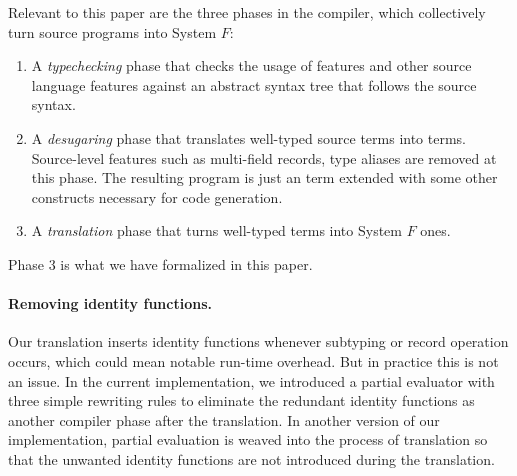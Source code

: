 Relevant to this paper are the three phases in the compiler, which
collectively turn source programs into System $F$:

\begin{enumerate}
\item A \emph{typechecking} phase that checks the usage of \name features and
  other source language features against an abstract syntax tree that follows
  the source syntax.

\item A \emph{desugaring} phase that translates well-typed source terms into
  \name terms. Source-level features such as multi-field records, type aliases
  are removed at this phase. The resulting program is just an \name term
  extended with some other constructs necessary for code generation.

\item A \emph{translation} phase that turns well-typed \name terms into System
  $F$ ones.
\end{enumerate}

Phase 3 is what we have formalized in this paper.

\paragraph{Removing identity functions.} Our translation inserts identity
functions whenever subtyping or record operation occurs, which could mean
notable run-time overhead. But in practice this is not an issue. In the current
implementation, we introduced a partial evaluator with three simple rewriting
rules to eliminate the redundant identity functions as another compiler phase
after the translation. In another version of our implementation, partial
evaluation is weaved into the process of translation so that the unwanted
identity functions are not introduced during the translation.
